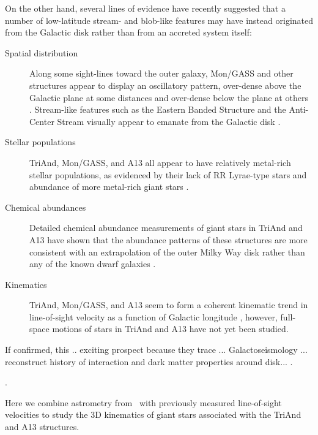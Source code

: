 \documentclass[twocolumn]{aastex62}
\newcommand{\gaia}{\project{Gaia}}
\begin{document}
On the other hand, several lines of evidence have recently suggested that a
number of low-latitude stream- and blob-like features may have instead
originated from the Galactic disk rather than from an accreted system itself:
\begin{description}
    \item[Spatial distribution]
        Along some sight-lines toward the outer galaxy, Mon/GASS and other
        structures appear to display an oscillatory pattern, over-dense above
        the Galactic plane at some distances and over-dense below the plane at
        others \citep[e.g.,][]{Newberg:2002, Xu:2015}.
        Stream-like features such as the Eastern Banded Structure
        \citep[EBS;][]{Grillmair:2006b} and the Anti-Center Stream
        \citep[ACS;][]{Grillmair:2006b} visually appear to emanate from the
        Galactic disk \citep{Slater:2014, Morganson:2014}.
    \item[Stellar populations]
        TriAnd, Mon/GASS, and A13 all appear to have relatively metal-rich
        stellar populations, as evidenced by their lack of RR Lyrae-type stars
        and abundance of more metal-rich giant stars \citep{Price-Whelan:2015,
        Sheffield:TODO}.
    \item[Chemical abundances]
        Detailed chemical abundance measurements of giant stars in TriAnd and
        A13 have shown that the abundance patterns of these structures are more
        consistent with an extrapolation of the outer Milky Way disk rather than
        any of the known dwarf galaxies \citep{Bergemann:2018, Hayes:2018}.
    \item[Kinematics]
        TriAnd, Mon/GASS, and A13 seem to form a coherent kinematic trend in
        line-of-sight velocity as a function of Galactic longitude \citep{TODO,
        Johnston:2017}, however, full-space motions of stars in TriAnd and A13
        have not yet been studied.
\end{description}
If confirmed, this .. exciting prospect because they trace ... Galactoseismology
... reconstruct history of interaction and dark matter properties around disk...
\citep[e.g.,][]{Chakrabarti:TODO, Laporte:TODO}.

\citep[for a recent review, see][]{Johnston:2017}.

Here we combine astrometry from \gaia\ with previously measured line-of-sight
velocities to study the 3D kinematics of giant stars associated with the TriAnd
and A13 structures.
\end{document}
